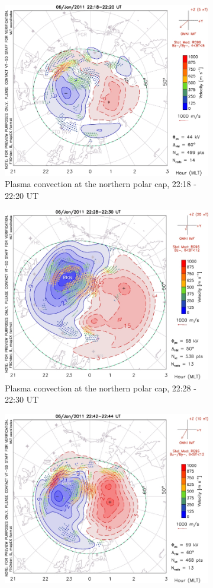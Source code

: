 \documentclass[10pt,a4paper]{article}
\begin{document}
\begin{figure}[h]
\begin{subfigure}[h]{.5\textwidth}
	\includegraphics[width=.8\linewidth]{pot_1449166790.jpg}
	\caption{Plasma convection at the northern polar cap, 22:18 - 22:20 UT}
	\label{darn6}
\end{subfigure}
\begin{subfigure}[h]{.5\textwidth}
	\centering
	\includegraphics[width=.8\linewidth]{pot_1449173054.jpg}
	\caption{Plasma convection at the northern polar cap, 22:28 - 22:30 UT}
	\label{darn9}
\end{subfigure}
\begin{subfigure}[h]{.5\textwidth}
	\centering
	\includegraphics[width=.8\linewidth]{pot_1449167770.jpg}

\end{subfigure}
\end{figure}
\end{document}
